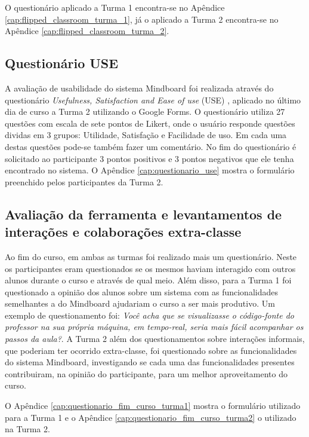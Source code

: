 O questionário aplicado a Turma 1 encontra-se no Apêndice \ref{cap:flipped_classroom_turma_1}, já o aplicado a Turma 2 encontra-se no Apêndice \ref{cap:flipped_classroom_turma_2}.

\subsection{Questionário USE}

A avaliação de usabilidade do sistema Mindboard foi realizada através do questionário
\emph{Usefulness, Satisfaction and Ease of use} (USE) \cite{useq}, aplicado no último dia de curso a Turma 2 utilizando o Google Forms. O questionário utiliza 27 questões com escala de sete pontos
de Likert, onde o usuário responde questões dividas em 3 grupos: Utilidade, Satisfação
e Facilidade de uso. Em cada uma destas questões pode-se também fazer um comentário. No fim do questionário é solicitado ao participante 3 pontos positivos e 3 pontos negativos que ele tenha encontrado no sistema. O Apêndice \ref{cap:questionario_use} mostra o formulário preenchido pelos participantes da Turma 2.

\subsection{Avaliação da ferramenta e levantamentos de interações e colaborações extra-classe}

Ao fim do curso, em ambas as turmas foi realizado mais um questionário. Neste os participantes eram questionados se os mesmos haviam interagido com outros alunos durante o curso e através de qual meio. Além disso, para a Turma 1 foi questionado a opinião dos alunos sobre um sistema com as funcionalidades semelhantes a do Mindboard ajudariam o curso a ser mais produtivo. Um exemplo de questionamento foi: \emph{Você acha que se visualizasse o código-fonte do professor na sua própria máquina, em tempo-real, seria mais fácil acompanhar os passos da aula?}. A Turma 2 além dos questionamentos sobre interações informais, que poderiam ter ocorrido extra-classe, foi questionado sobre as funcionalidades do sistema Mindboard, investigando se cada uma das funcionalidades presentes contribuiram, na opinião do participante, para um melhor aproveitamento do curso.

O Apêndice \ref{cap:questionario_fim_curso_turma1} mostra o formulário utilizado para a Turma 1 e o Apêndice \ref{cap:questionario_fim_curso_turma2} o utilizado na Turma 2.



